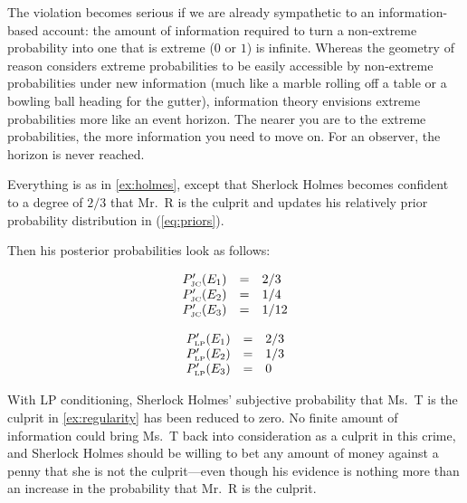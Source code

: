 \documentclass[smallextended]{svjour3}       %
\begin{document}
The violation becomes serious if we are already sympathetic to an
infor\-ma\-tion-based account: the amount of information required to turn
a non-extreme probability into one that is extreme ($0$ or $1$) is
infinite. Whereas the geometry of reason considers extreme
probabilities to be easily accessible by non-extreme probabilities
under new information (much like a marble rolling off a table or a
bowling ball heading for the gutter), information theory envisions
extreme probabilities more like an event horizon. The nearer you are
to the extreme probabilities, the more information you need to move
on. For an observer, the horizon is never reached.

\begin{quotex}
  \label{ex:regularity} Everything is as
  in {\xample} \ref{ex:holmes}, except that Sherlock Holmes becomes
  confident to a degree of $2/3$ that Mr.\ R is the culprit and
  updates his relatively prior probability distribution in
  (\ref{eq:priors}).
\end{quotex}

Then his posterior probabilities look as follows:

\begin{equation}
  \label{eq:sherlockposteriorjcreg}
  \begin{array}{rcl}
  P'_{\mbox{\tiny JC}}(E_{1})&=&2/3\\
  P'_{\mbox{\tiny JC}}(E_{2})&=&1/4\\
  P'_{\mbox{\tiny JC}}(E_{3})&=&1/12
\end{array}
\end{equation}

\begin{equation}
  \label{eq:sherlockposteriorlpreg}
  \begin{array}{rcl}
  P'_{\mbox{\tiny LP}}(E_{1})&=&2/3\\
  P'_{\mbox{\tiny LP}}(E_{2})&=&1/3\\
  P'_{\mbox{\tiny LP}}(E_{3})&=&0
\end{array}
\end{equation}

With LP conditioning, Sherlock Holmes' subjective probability that
Ms.\ T is the culprit in {\xample} \ref{ex:regularity} has been reduced
to zero. No finite amount of information could bring Ms.\ T back into
consideration as a culprit in this crime, and Sherlock Holmes should
be willing to bet any amount of money against a penny that she is not
the culprit---even though his evidence is nothing more than an
increase in the probability that Mr.\ R is the culprit.
\end{document}
